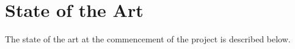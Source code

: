 \chapter{State of the Art}
\label{ch:State_art}

The state of the art at the commencement of the project is described below.


